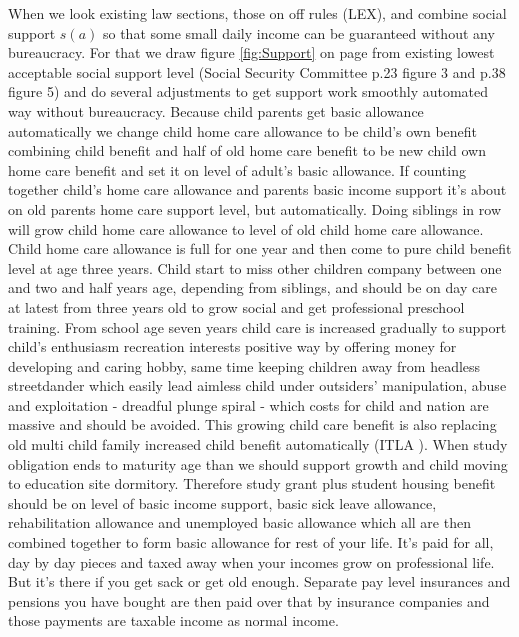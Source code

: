 When we look existing law sections, those on off rules
(LEX\allowbreak\cite{LEX_2012_916en}), and combine social support $s(a)$ so
that some small daily income can be guaranteed without any bureaucracy. For
that we draw figure \ref{fig:Support} on page \pageref{fig:Support} from
existing lowest acceptable social support level (Social Security Committee
\cite{VN_2023_26} p.23 figure 3 and p.38 figure 5) and do several adjustments
to get support work smoothly automated way without bureaucracy. Because child
parents get basic allowance automatically we change child home care allowance
to be child's own benefit combining child benefit and half of old home care
benefit to be new child own home care benefit and set it on level of adult's
basic allowance\allowbreak\cite{VN_2025_22}. If counting together child's home
care allowance and parents basic income support it's about on old parents home
care support level, but automatically. Doing siblings in row will grow child
home care allowance to level of old child home care allowance. Child home care
allowance is full for one year and then come to pure child benefit level at
age three years. Child start to miss other children company between one and
two and half years age, depending from siblings, and should be on day care at
latest from three years old to grow social and get professional preschool
training. From school age seven years child care is increased gradually to
support child's enthusiasm recreation interests positive way by offering money
for developing and caring hobby, same time keeping children away from headless
streetdander which easily lead aimless child under outsiders' manipulation,
abuse and exploitation - dreadful plunge spiral - which costs for child and
nation are massive and should be avoided. This growing child care benefit is
also replacing old multi child family increased child benefit automatically
(ITLA \cite{ITLA_2023_LL}). When study obligation ends to maturity age than we
should support growth and child moving to education site dormitory. Therefore
study grant plus student housing benefit should be on level of basic income
support, basic sick leave allowance, rehabilitation allowance and unemployed
basic allowance which all are then combined together to form basic allowance
for rest of your life. It's paid for all, day by day pieces and taxed away
when your incomes grow on professional life. But it's there if you get sack or
get old enough. Separate pay level insurances and pensions you have bought are
then paid over that by insurance companies and those payments are taxable
income as normal income.

